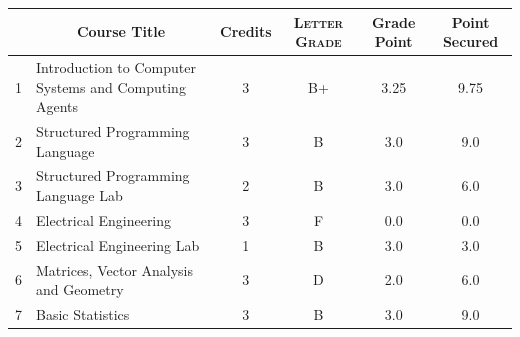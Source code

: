 \documentclass[11pt]{article}
\newcommand*{\numtwo}[1]{\pgfmathprintnumber[
                    fixed, precision=2, fixed zerofill=true]{#1}}
\begin{document}
                \begin{center}
                    \renewcommand{\arraystretch}{1.08}
                    
                \begin{tabular}{|c|l|c|>{\scshape}c|c|c|}
                \hline  \rule[-1ex]{0pt}{3.5ex} {\centering{\bf Course Code}} &  \multicolumn{1}{c|}{\textbf{Course Title}}  & {\bf Credits} & {\bf Letter Grade} & {\bf Grade Point} & {\bf Point Secured}  \\ 
                \hline   1 &  Introduction to Computer Systems and Computing Agents		 & 3 & B+ & 3.25 & 9.75 \\ %
                \hline   2 &  Structured Programming Language		 & 3 & B & 3.0 & 9.0 \\ %
                \hline   3 &  Structured Programming Language Lab		 & 2 & B & 3.0 & 6.0 \\ %
                \hline   4 &  Electrical Engineering		 & 3 & F & 0.0 & 0.0 \\ %
                \hline   5 &  Electrical Engineering Lab		 & 1 & B & 3.0 & 3.0 \\ %
                \hline   6 &  Matrices, Vector Analysis and Geometry		 & 3 & D & 2.0 & 6.0 \\ %
                \hline   7 &  Basic Statistics		 & 3 & B & 3.0 & 9.0 \\ %

\hline                %
                \end{tabular}
                \end{center}
                \renewcommand{\arraystretch}{1.03}
\end{document}
